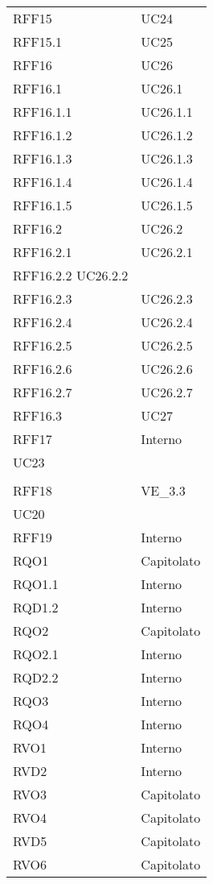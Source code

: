 \begin{longtable}{ >{\centering}p{}
		>{\centering}p{}}
\tabularnewline
RFF15 & UC24 \tabularnewline
RFF15.1 & UC25
\tabularnewline
RFF16 & UC26 
\tabularnewline
RFF16.1 & UC26.1
\tabularnewline
RFF16.1.1 & UC26.1.1
\tabularnewline
RFF16.1.2 & UC26.1.2
\tabularnewline
RFF16.1.3 & UC26.1.3
\tabularnewline
RFF16.1.4 & UC26.1.4
\tabularnewline
RFF16.1.5 & UC26.1.5
\tabularnewline
RFF16.2 & UC26.2
\tabularnewline
RFF16.2.1 & UC26.2.1
\tabularnewline
RFF16.2.2 UC26.2.2
\tabularnewline
RFF16.2.3 & UC26.2.3
\tabularnewline
RFF16.2.4 & UC26.2.4
\tabularnewline
RFF16.2.5 & UC26.2.5
\tabularnewline
RFF16.2.6 & UC26.2.6
\tabularnewline
RFF16.2.7 & UC26.2.7
\tabularnewline
RFF16.3 & UC27
\tabularnewline
RFF17 &	Interno\\
UC23\\ 	\tabularnewline
RFF18 &	VE\_3.3\\
UC20   	\tabularnewline
RFF19 &	Interno \tabularnewline
RQO1	&	Capitolato \tabularnewline
RQO1.1	&	Interno \tabularnewline
RQD1.2	&	Interno \tabularnewline
RQO2	&	Capitolato \tabularnewline
RQO2.1	&	Interno \tabularnewline
RQD2.2	&	Interno \tabularnewline
RQO3	&	Interno \tabularnewline
RQO4	&	Interno \tabularnewline
RVO1	&	Interno \tabularnewline
RVD2	&	Interno \tabularnewline
RVO3	&	Capitolato \tabularnewline
RVO4	&	Capitolato \tabularnewline
RVD5	&	Capitolato \tabularnewline
RVO6	&	Capitolato \tabularnewline
		
\end{longtable}




